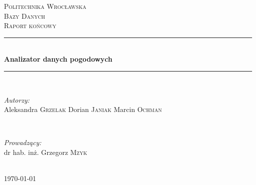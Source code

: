 \documentclass[a4paper]{article}
\begin{document}
\begin{titlepage}

\newcommand{\HRule}{\rule{\linewidth}{0.5mm}} 

\center 
 

\textsc{\LARGE Politechnika Wrocławska}\\[1.0cm] %
\textsc{\Large Bazy Danych}\\[0.2cm] %
\textsc{\large Raport końcowy}\\[2cm]


\HRule \\[0.4cm]
{ \huge \bfseries Analizator danych pogodowych}\\[0.4cm] %
\HRule \\[3cm]
 

\begin{minipage}{0.4\textwidth}
\begin{flushleft} \large
\emph{Autorzy:}\\
Aleksandra \textsc{Grzelak}\newline
Dorian \textsc{Janiak}\newline
Marcin \textsc{Ochman}

\end{flushleft}
\end{minipage}
~
\begin{minipage}{0.4\textwidth}
\begin{flushright} \large
\emph{Prowadzący:} \\
dr hab. inż. Grzegorz \textsc{Mzyk}
\end{flushright}
\end{minipage}\\[12cm]

{\large \today}\\[3cm] 


\vfill 

\end{titlepage}
\end{document}
